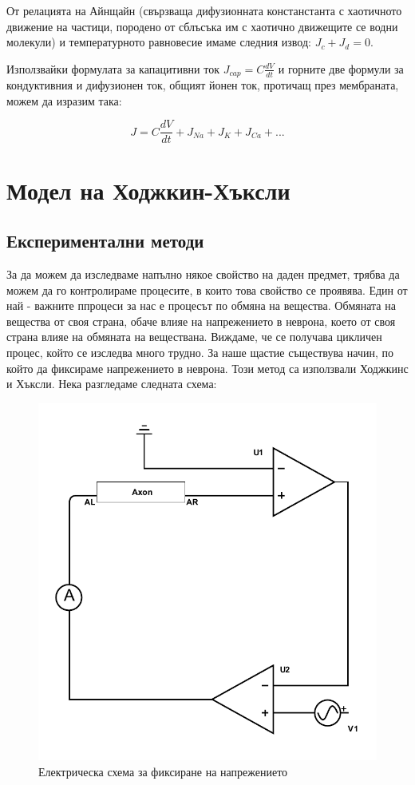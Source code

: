 \documentclass{article}
\begin{document}
От релацията на Айнщайн (свързваща дифузионната констанстанта с хаотичното движение на частици, породено от сблъсъка им с хаотично движещите се водни молекули) и температурното равновесие имаме следния извод: $J_c + J_d = 0$.

Използвайки формулата за капацитивни ток $J_{cap}=C\frac{dV}{dt}$ и горните две формули за кондуктивния и дифузионен ток, общият йонен ток, протичащ през мембраната, можем да изразим така:

\begin{equation}
        J = C\frac{dV}{dt} + J_{Na} + J_{K} + J_{Ca} + ...
    \end{equation}

\section{Модел на Ходжкин-Хъксли}
    \subsection[Експериментални методи]{Експериментални методи}
        За да можем да изследваме напълно някое свойство на даден предмет, трябва да можем да го контролираме процесите, в които това свойство
        се проявява.  Един от най - важните ппроцеси за нас е процесът по обмяна на вещества.  Обмяната на вещества от своя страна, обаче влияе
        на напрежението в неврона, което от своя страна влияе на обмяната на веществана. Виждаме, че се получава цикличен процес, който се
        изследва много трудно. За наше щастие съществува начин, по който да фиксираме напрежението в неврона. Този метод са използвали Ходжкинс
        и Хъксли. Нека разгледаме следната схема:

        \begin{figure}[h!]
            \centering
            \includegraphics{./schemas/voltage-clamp.pdf}
            \caption{Електрическа схема за фиксиране на напрежението}
        \end{figure}
\end{document}
